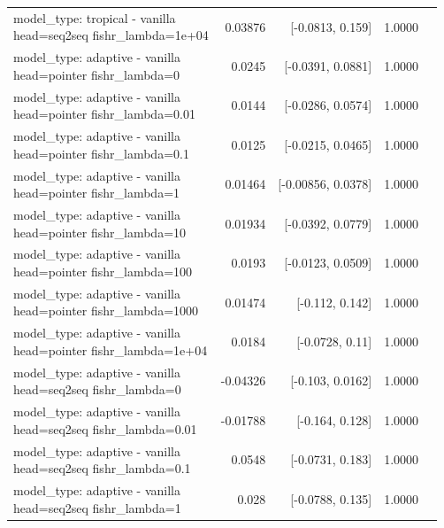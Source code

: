 \documentclass[10pt]{article}
\makeatletter
\newcommand{\stackcell}[1]{\begin{tabular}[t]{@{}l@{}}#1\end{tabular}}
\makeatother
\begin{document}
{\begin{longtable}{lrrrl}
\stackcell{model\_type: tropical - vanilla\\\footnotesize head=seq2seq fishr\_lambda=1e+04 } & 0.03876 & [-0.0813, 0.159] & 1.0000 & \\
\stackcell{model\_type: adaptive - vanilla\\\footnotesize head=pointer fishr\_lambda=0 } & 0.0245 & [-0.0391, 0.0881] & 1.0000 & \\
\stackcell{model\_type: adaptive - vanilla\\\footnotesize head=pointer fishr\_lambda=0.01 } & 0.0144 & [-0.0286, 0.0574] & 1.0000 & \\
\stackcell{model\_type: adaptive - vanilla\\\footnotesize head=pointer fishr\_lambda=0.1 } & 0.0125 & [-0.0215, 0.0465] & 1.0000 & \\
\stackcell{model\_type: adaptive - vanilla\\\footnotesize head=pointer fishr\_lambda=1 } & 0.01464 & [-0.00856, 0.0378] & 1.0000 & \\
\stackcell{model\_type: adaptive - vanilla\\\footnotesize head=pointer fishr\_lambda=10 } & 0.01934 & [-0.0392, 0.0779] & 1.0000 & \\
\stackcell{model\_type: adaptive - vanilla\\\footnotesize head=pointer fishr\_lambda=100 } & 0.0193 & [-0.0123, 0.0509] & 1.0000 & \\
\stackcell{model\_type: adaptive - vanilla\\\footnotesize head=pointer fishr\_lambda=1000 } & 0.01474 & [-0.112, 0.142] & 1.0000 & \\
\stackcell{model\_type: adaptive - vanilla\\\footnotesize head=pointer fishr\_lambda=1e+04 } & 0.0184 & [-0.0728, 0.11] & 1.0000 & \\
\stackcell{model\_type: adaptive - vanilla\\\footnotesize head=seq2seq fishr\_lambda=0 } & -0.04326 & [-0.103, 0.0162] & 1.0000 & \\
\stackcell{model\_type: adaptive - vanilla\\\footnotesize head=seq2seq fishr\_lambda=0.01 } & -0.01788 & [-0.164, 0.128] & 1.0000 & \\
\stackcell{model\_type: adaptive - vanilla\\\footnotesize head=seq2seq fishr\_lambda=0.1 } & 0.0548 & [-0.0731, 0.183] & 1.0000 & \\
\stackcell{model\_type: adaptive - vanilla\\\footnotesize head=seq2seq fishr\_lambda=1 } & 0.028 & [-0.0788, 0.135] & 1.0000 & \\

\end{longtable}}
\end{document}

